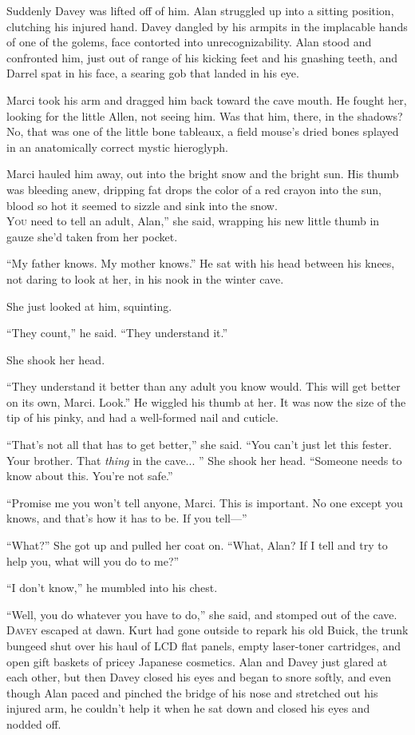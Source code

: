 Suddenly Davey was lifted off of him.  Alan struggled up into a
sitting position, clutching his injured hand.  Davey dangled by his
armpits in the implacable hands of one of the golems, face contorted
into unrecognizability.  Alan stood and confronted him, just out of
range of his kicking feet and his gnashing teeth, and Darrel spat in
his face, a searing gob that landed in his eye.

Marci took his arm and dragged him back toward the cave mouth.  He
fought her, looking for the little Allen, not seeing him.  Was that
him, there, in the shadows?  No, that was one of the little bone
tableaux, a field mouse's dried bones splayed in an anatomically
correct mystic hieroglyph.

Marci hauled him away, out into the bright snow and the bright sun. 
His thumb was bleeding anew, dripping fat drops the color of a red
crayon into the sun, blood so hot it seemed to sizzle and sink into
the snow.
\\
\lettrine[lines=3, lhang=.5, nindent=0pt, findent=2pt]{Y}{ou}
need to tell an adult, Alan,'' she said, wrapping his new little
thumb in gauze she'd taken from her pocket.

``My father knows.  My mother knows.'' He sat with his head between
his knees, not daring to look at her, in his nook in the winter cave.

She just looked at him, squinting.

``They count,'' he said.  ``They understand it.''

She shook her head.

``They understand it better than any adult you know would.  This will
get better on its own, Marci.  Look.'' He wiggled his thumb at her. 
It was now the size of the tip of his pinky, and had a well-formed
nail and cuticle.

``That's not all that has to get better,'' she said.  ``You can't just
let this fester.  Your brother.  That \textit{thing} in the cave... 
'' She shook her head.  ``Someone needs to know about this.  You're
not safe.''

``Promise me you won't tell anyone, Marci.  This is important.  No one
except you knows, and that's how it has to be.  If you tell---''

``What?'' She got up and pulled her coat on.  ``What, Alan?  If I tell
and try to help you, what will you do to me?''

``I don't know,'' he mumbled into his chest.

``Well, you do whatever you have to do,'' she said, and stomped out of
the cave.
\\
\lettrine[lines=3, lhang=.5, nindent=0pt, findent=2pt]{D}{avey} escaped at dawn.  Kurt had gone outside to repark his old Buick,
the trunk bungeed shut over his haul of LCD flat panels, empty
laser-toner cartridges, and open gift baskets of pricey Japanese
cosmetics.  Alan and Davey just glared at each other, but then Davey
closed his eyes and began to snore softly, and even though Alan paced
and pinched the bridge of his nose and stretched out his injured arm,
he couldn't help it when he sat down and closed his eyes and nodded
off.

